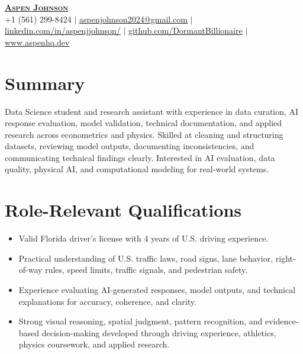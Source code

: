 \documentclass[letterpaper,11pt]{article}
\newcommand{\resumeItem}[1]{
  \item\small{
    {#1 \vspace{-1pt}}
  }
}
\newcommand{\resumeItemListStart}{\begin{itemize}}
\newcommand{\resumeItemListEnd}{\end{itemize}\vspace{-5pt}}
\begin{document}

\begin{center}
    \textbf{\Huge \scshape \underline{Aspen Johnson}} \\ \vspace{5pt}
    \small +1 (561) 299-8424 $|$ \href{mailto:aspenjohnson2024@gmail.com}{aspenjohnson2024@gmail.com} $|$
    \href{https://www.linkedin.com/in/aspenjjohnson/}{linkedin.com/in/aspenjjohnson/} $|$
    \href{https://github.com/DormantBillionaire}{github.com/DormantBillionaire} $|$
    \href{https://www.aspenhq.dev/}{www.aspenhq.dev}
\end{center}

\section{Summary}
Data Science student and research assistant with experience in data curation, AI response evaluation, model validation, 
technical documentation, and applied research across econometrics and physics. Skilled at cleaning and structuring datasets, 
reviewing model outputs, documenting inconsistencies, and communicating technical findings clearly. Interested in AI evaluation, 
data quality, physical AI, and computational modeling for real-world systems.

\section{Role-Relevant Qualifications}
  \resumeItemListStart
    \resumeItem{Valid Florida driver's license with 4 years of U.S. driving experience.}
    \resumeItem{Practical understanding of U.S. traffic laws, road signs, lane behavior, right-of-way rules, speed limits, traffic signals, and pedestrian safety.}
    \resumeItem{Experience evaluating AI-generated responses, model outputs, and technical explanations for accuracy, coherence, and clarity.}
    \resumeItem{Strong visual reasoning, spatial judgment, pattern recognition, and evidence-based decision-making developed through driving experience, athletics, physics coursework, and applied research.}
  \resumeItemListEnd
\end{document}
